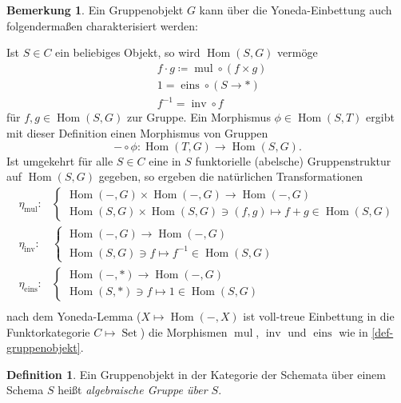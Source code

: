 \documentclass{amsart}
\theoremstyle{plain}
\theoremstyle{definition}
\newtheorem{definition}[subsection]{Definition}
\newtheorem{remark}[subsection]{Bemerkung}
\renewcommand{\hom}{\operatorname{Hom}}
\begin{document}
\begin{remark}
	Ein Gruppenobjekt $G$ kann über die Yoneda-Einbettung auch folgendermaßen charakterisiert werden:

	\noindent Ist $S \in C$ ein beliebiges Objekt, so wird $\hom(S, G)$ vermöge
	\begin{align*}
		& f \cdot g \coloneqq \operatorname{mul} \circ (f \times g) \\
		& 1 = \operatorname{eins} \circ (S \rightarrow *) \\
		& f^{-1} = \operatorname{inv} \circ f
	\end{align*}
	für $f, g \in \hom(S, G)$ zur Gruppe. Ein Morphismus $\phi \in \hom(S, T)$ ergibt mit dieser Definition einen Morphismus von Gruppen
	\begin{equation*}
		- \circ \phi \colon \hom(T, G) \rightarrow \hom(S, G).
	\end{equation*}
	Ist umgekehrt für alle $S \in C$ eine in $S$ funktorielle (abelsche) Gruppenstruktur auf $\hom(S, G)$ gegeben, so ergeben die natürlichen Transformationen
	\begin{align*}
		\eta_{\operatorname{mul}} \colon &
		\begin{cases}
			\hom(-, G) \times \hom(-, G) \rightarrow \hom(-, G) \\
			\hom(S, G) \times \hom(S, G) \ni (f, g) \mapsto f + g \in \hom(S, G)
		\end{cases} \\
		\eta_{\operatorname{inv}} \colon &
		\begin{cases}
			\hom(-, G) \rightarrow \hom(-, G) \\
			\hom(S, G) \ni f \mapsto f^{-1} \in \hom(S, G)
		\end{cases} \\
		\eta_{\operatorname{eins}} \colon &
		\begin{cases}
			\hom(-, *) \rightarrow \hom(-, G) \\
			\hom(S, *) \ni f \mapsto 1 \in \hom(S, G)
		\end{cases} \\
	\end{align*}
	nach dem Yoneda-Lemma ($X \mapsto \hom(-, X)$ ist voll-treue Einbettung in die Funktorkategorie $C \mapsto \operatorname{Set}$) die Morphismen $\operatorname{mul}$, $\operatorname{inv}$ und $\operatorname{eins}$ wie in \ref{def-gruppenobjekt}.
\end{remark}

\begin{definition}
	Ein Gruppenobjekt in der Kategorie der Schemata über einem Schema $S$ heißt {\it algebraische Gruppe über $S$}.
\end{definition}
\end{document}
